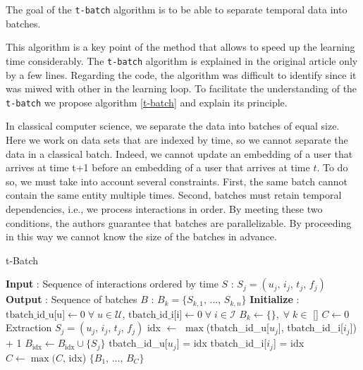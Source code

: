 The goal of the \texttt{t-batch} algorithm is to be able to separate temporal data into batches. 

This algorithm is a key point of the method that allows to speed up the learning time considerably. The \texttt{t-batch} algorithm is explained in the original article only by a few lines. Regarding the code, the algorithm was difficult to identify since it was miwed with other in the learning loop. To facilitate the understanding of the \texttt{t-batch} we propose algorithm \ref{t-batch} and explain its principle.

In classical computer science, we separate the data into batches of equal size. Here we work on data sets that are indexed by time, so we cannot separate the data in a classical batch. Indeed, we cannot update an embedding of a user that arrives at time t+1 before an embedding of a user that arrives at time $t$. To do so, we must take into account several constraints. First, the same batch cannot contain the same entity multiple times. Second, batches must retain temporal dependencies, i.e., we process interactions in order. By meeting these two conditions, the authors guarantee that batches are parallelizable. By proceeding in this way we cannot know the size of the batches in advance.

    \begin{algorithm}[H]
        \caption{t-Batch}
        \label{t-batch}
        \begin{algorithmic} 
            \STATE \textbf{Input} : Sequence of interactions ordered by time $S$ : $S_j = (u_j,\,i_j,\,t_j,\,f_j)$
            \STATE \textbf{Output} : Sequence of batches $B$ : $B_k = \{S_{k,1},\,...,\,S_{k,n} \}$
            \STATE \textbf{Initialize} : 
            \STATE \quad $\text{tbatch\_id\_u[u]} \leftarrow 0 \; \forall \; u \in \mathcal{U}$, \quad $\text{tbatch\_id\_i[i]} \leftarrow 0 \; \forall \; i \in \mathcal{I}$
            \STATE \quad $B_k \leftarrow \{ \},\; \forall \; k \in$ [\!]
            \STATE \quad $C \leftarrow 0$
                \STATE Extraction $S_j = (u_j,\,i_j,\,t_j,\,f_j)$
                \STATE idx $\leftarrow$ $\max$(tbatch\_id\_u[$u_j$], tbatch\_id\_i[$i_j$]) + 1
                \STATE $B_\text{idx} \leftarrow B_\text{idx} \cup \{ S_j \}$
                \STATE tbatch\_id\_u[$u_j$] = idx
                \STATE tbatch\_id\_i[$i_j$] = idx
                \STATE $C \leftarrow \max(C,\,$idx)
            \ENDFOR
            \RETURN $\{ B_1,\,...,\,B_C \}$
        \end{algorithmic}
    \end{algorithm}


